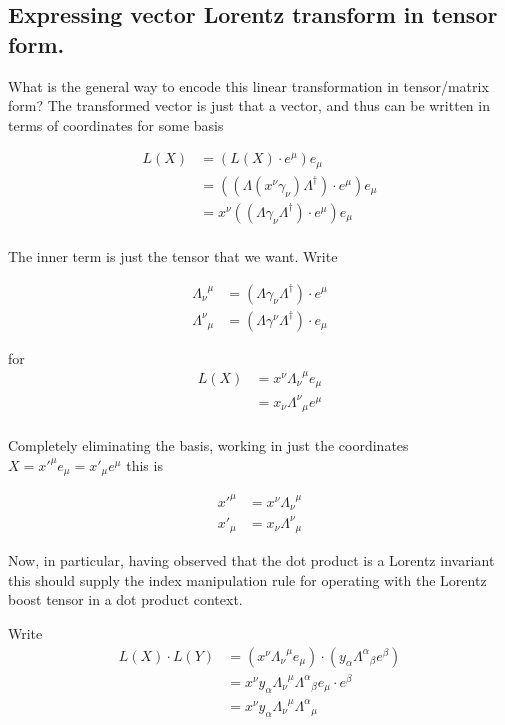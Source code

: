 \subsection{Expressing vector Lorentz transform in tensor form. }

What is the general way to encode this linear transformation in tensor/matrix form?  The transformed vector is just that a vector, and thus can be written in terms of 
coordinates for some basis

\begin{align*}
L(X) 
&= (L(X) \cdot e^\mu) e_\mu \\
&= ((\Lambda (x^\nu \gamma_\nu) \Lambda^\dagger) \cdot e^\mu) e_\mu \\
&= x^\nu ((\Lambda \gamma_\nu \Lambda^\dagger) \cdot e^\mu) e_\mu \\
\end{align*}

The inner term is just the tensor that we want.  Write

\begin{align*}
{\Lambda_{\nu}}^{\mu} &= (\Lambda \gamma_\nu \Lambda^\dagger) \cdot e^\mu \\
{\Lambda^{\nu}}_{\mu} &= (\Lambda \gamma^\nu \Lambda^\dagger) \cdot e_\mu
\end{align*}

for 
\begin{align*}
L(X) &= x^\nu {\Lambda_{\nu}}^{\mu} e_\mu \\
     &= x_\nu {\Lambda^{\nu}}_{\mu} e^\mu \\
\end{align*}

Completely eliminating the basis, working in just the coordinates $X = {x'}^\mu e_\mu = {x'}_\mu e^\mu$ this is

\begin{align}
{x'}^\mu &= x^\nu {\Lambda_{\nu}}^{\mu} \\
{x'}_\mu &= x_\nu {\Lambda^{\nu}}_{\mu}
\end{align}

Now, in particular, having observed that the dot product is a Lorentz invariant this should supply the index manipulation rule for operating
with the Lorentz boost tensor in a dot product context.

Write
\begin{align*}
L(X) \cdot L(Y)
&= (x^\nu {\Lambda_{\nu}}^{\mu} e_\mu) \cdot (y_\alpha {\Lambda^{\alpha}}_{\beta} e^\beta) \\
&= x^\nu y_\alpha {\Lambda_{\nu}}^{\mu} {\Lambda^{\alpha}}_{\beta} e_\mu \cdot e^\beta \\
&= x^\nu y_\alpha {\Lambda_{\nu}}^{\mu} {\Lambda^{\alpha}}_{\mu} \\
\end{align*}

